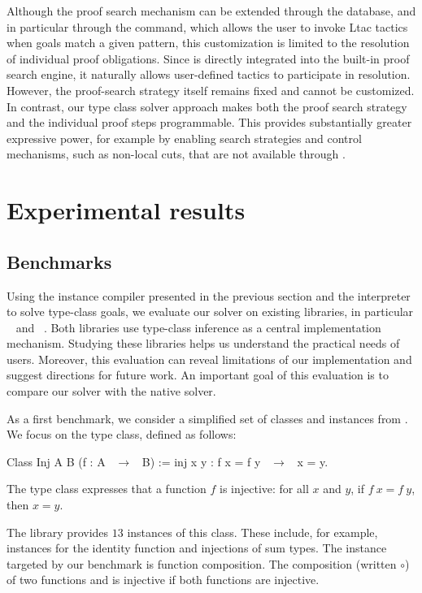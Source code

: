 Although the \rocq proof search mechanism can be extended through the 
database, and in particular through the  command, which allows
the user to invoke Ltac tactics when goals match a given pattern, this
customization is limited to the resolution of individual proof obligations.
Since  is directly integrated into the built-in proof search
engine, it naturally allows user-defined tactics to participate in resolution.
However, the proof-search strategy itself remains fixed and cannot be
customized. In contrast, our type class solver approach makes both the proof
search strategy and the individual proof steps programmable. This provides
substantially greater expressive power, for example by enabling search
strategies and control mechanisms, such as non-local cuts, that are not
available through .

\section{Experimental results}
\label{sec:exp-res}

\subsection{Benchmarks}
\label{sec:bench}

Using the instance compiler presented in the previous section and the \elpi
interpreter to solve type-class goals, we evaluate our solver on existing
libraries, in particular \tlc~\cite{tlc} and \stdpp~\cite{stdpp}. Both libraries
use type-class inference as a central implementation mechanism. Studying these
libraries helps us understand the practical needs of \rocq users. Moreover, this
evaluation can reveal limitations of our implementation and suggest directions
for future work. An important goal of this evaluation is to compare our solver
with the native \rocq solver.

As a first benchmark, we consider a simplified set of classes and instances from
\stdpp. We focus on the  type class, defined as follows:

\begin{coqcode}
Class Inj {A B} (f : A ~$\to$~ B) :=
  inj x y : f x = f y ~$\to$~ x = y.
\end{coqcode}

The  type class expresses that a function $f$ is injective: for all
$x$ and $y$, if $f\ x = f\ y$, then $x = y$.

The library provides $13$ instances of this class. These include, for example,
instances for the identity function and injections of sum types. The instance
targeted by our benchmark is function composition. The composition (written
$\circ$) of two functions  and  is injective if both functions are
injective.

